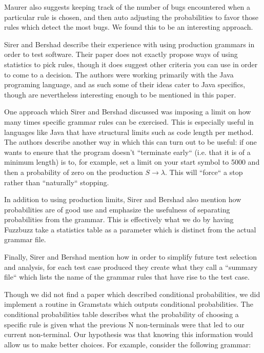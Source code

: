 Maurer also suggests keeping track of the number of bugs encountered when a
particular rule is chosen, and then auto adjusting the probabilities to favor
those rules which detect the most bugs. We found this to be an interesting
approach.

Sirer and Bershad\cite{Bershad1999} describe their experience with using
production grammars in order to test software. Their paper does not exactly
propose ways of using statistics to pick rules, though it does suggest other
criteria you can use in order to come to a decision. The authors were working
primarily with the Java programing language, and as such some of their ideas
cater to Java specifics, though are nevertheless interesting enough to be
mentioned in this paper.

One approach which Sirer and Bershad discussed was imposing a limit on how many
times specific grammar rules can be exercised. This is especially useful in
languages like Java that have structural limits such as code length per
method. The authors describe another way in which this can turn out to be
useful: if one wants to ensure that the program doesn't ``terminate early``
(i.e. that it is of a minimum length) is to, for example, set a limit on your
start symbol to 5000 and then a probability of zero on the production $S
\rightarrow \lambda$. This will ``force`` a stop rather than ``naturally``
stopping.

In addition to using production limits, Sirer and Bershad also mention how
probabilities are of good use and emphasize the usefulness of separating
probabilities from the grammar. This is effectively what we do by having
Fuzzbuzz take a statistics table as a parameter which is distinct from the
actual grammar file.

Finally, Sirer and Bershad mention how in order to simplify future test
selection and analysis, for each test case produced they create what they call
a ``summary file`` which lists the name of the grammar rules that have rise to
the test case.

Though we did not find a paper which described conditional probabilities, we
did implement a routine in Gramstats which outputs conditional probabilities.
The conditional probabilities table describes what the probability of choosing a
specific rule is given what the previous N non-terminals were that led to our
current non-terminal. Our hypothesis was that knowing this information would
allow us to make better choices. For example, consider the following grammar:

